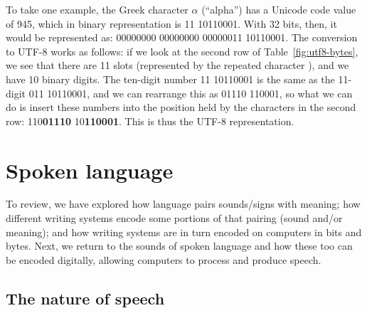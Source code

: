 To take one example, the Greek character $\alpha$ (``alpha'') has a
Unicode code value of 945, which in binary representation is 11
10110001.  With 32 bits, then, it would be represented as: 00000000
00000000 00000011 10110001.  The conversion to UTF-8 works as follows:
if we look at the second row of Table~\ref{fig:utf8-bytes}, we see
that there are 11 slots (represented by the repeated character ), and we have 10 binary digits.
The ten-digit number 11 10110001 is the same as the 11-digit 011
10110001, and we can rearrange this as 01110 110001, so what we can do
is insert these numbers into the position held by the  characters in the second row:
110\textbf{01110} 10\textbf{110001}.  This is thus the UTF-8
representation.

\section{Spoken language}
\label{sec:encoding-speech}
 
To review, we have explored how language pairs sounds/signs with meaning; how different writing systems encode some portions of that pairing (sound and/or meaning); and how writing systems are in turn encoded on computers in bits and bytes.  Next, we return to the sounds of spoken language and how these too can be encoded digitally, allowing computers to process and produce speech.
  


\subsection{The nature of speech}

